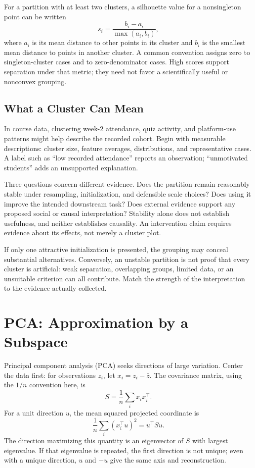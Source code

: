 For a partition with at least two clusters, a silhouette value for a nonsingleton point can be written \citep{rousseeuw1987silhouettes}
\[
s_i=\frac{b_i-a_i}{\max(a_i,b_i)},
\]
where $a_i$ is its mean distance to other points in its cluster and $b_i$ is the smallest mean distance to points in another cluster. A common convention assigns zero to singleton-cluster cases and to zero-denominator cases. High scores support separation under that metric; they need not favor a scientifically useful or nonconvex grouping.

\subsection{What a Cluster Can Mean}

In course data, clustering week-2 attendance, quiz activity, and platform-use patterns might help describe the recorded cohort. Begin with measurable descriptions: cluster size, feature averages, distributions, and representative cases. A label such as ``low recorded attendance'' reports an observation; ``unmotivated students'' adds an unsupported explanation.

Three questions concern different evidence. Does the partition remain reasonably stable under resampling, initialization, and defensible scale choices? Does using it improve the intended downstream task? Does external evidence support any proposed social or causal interpretation? Stability alone does not establish usefulness, and neither establishes causality. An intervention claim requires evidence about its effects, not merely a cluster plot.

If only one attractive initialization is presented, the grouping may conceal substantial alternatives. Conversely, an unstable partition is not proof that every cluster is artificial: weak separation, overlapping groups, limited data, or an unsuitable criterion can all contribute. Match the strength of the interpretation to the evidence actually collected.

\section{PCA: Approximation by a Subspace}

Principal component analysis (PCA) seeks directions of large variation. Center the data first: for observations $z_i$, let $x_i=z_i-\bar z$. The covariance matrix, using the $1/n$ convention here, is
\[
S=\frac1n\sum_i x_i x_i^\top.
\]
For a unit direction $u$, the mean squared projected coordinate is
\[
\frac1n\sum_i(x_i^\top u)^2=u^\top S u.
\]
The direction maximizing this quantity is an eigenvector of $S$ with largest eigenvalue. If that eigenvalue is repeated, the first direction is not unique; even with a unique direction, $u$ and $-u$ give the same axis and reconstruction.

